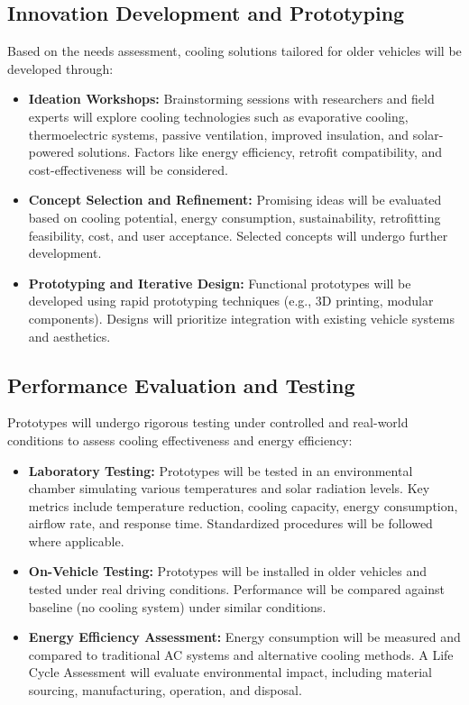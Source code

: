 \documentclass{article}
\theoremstyle{mytheoremstyle}
\theoremstyle{mytheoremstyle}
\theoremstyle{myproblemstyle}
\begin{document}
       \subsection{Innovation Development and Prototyping}

Based on the needs assessment, cooling solutions tailored for older vehicles will be developed through:
\begin{itemize}
	\item \textbf{Ideation Workshops:} Brainstorming sessions with researchers and field experts will explore cooling technologies such as evaporative cooling, thermoelectric systems, passive ventilation, improved insulation, and solar-powered solutions. Factors like energy efficiency, retrofit compatibility, and cost-effectiveness will be considered.
	\item  \textbf{Concept Selection and Refinement:} Promising ideas will be evaluated based on cooling potential, energy consumption, sustainability, retrofitting feasibility, cost, and user acceptance. Selected concepts will undergo further development.
	\item   \textbf{Prototyping and Iterative Design:} Functional prototypes will be developed using rapid prototyping techniques (e.g., 3D printing, modular components). Designs will prioritize integration with existing vehicle systems and aesthetics.
\end{itemize}
\subsection{Performance Evaluation and Testing}
Prototypes will undergo rigorous testing under controlled and real-world conditions to assess cooling effectiveness and energy efficiency:
\begin{itemize}
	\item \textbf{Laboratory Testing:} Prototypes will be tested in an environmental chamber simulating various temperatures and solar radiation levels. Key metrics include temperature reduction, cooling capacity, energy consumption, airflow rate, and response time. Standardized procedures will be followed where applicable.
	\item \textbf{On-Vehicle Testing:} Prototypes will be installed in older vehicles and tested under real driving conditions. Performance will be compared against baseline (no cooling system) under similar conditions.
	\item \textbf{Energy Efficiency Assessment:} Energy consumption will be measured and compared to traditional AC systems and alternative cooling methods. A Life Cycle Assessment will evaluate environmental impact, including material sourcing, manufacturing, operation, and disposal.
\end{itemize}
\end{document}
